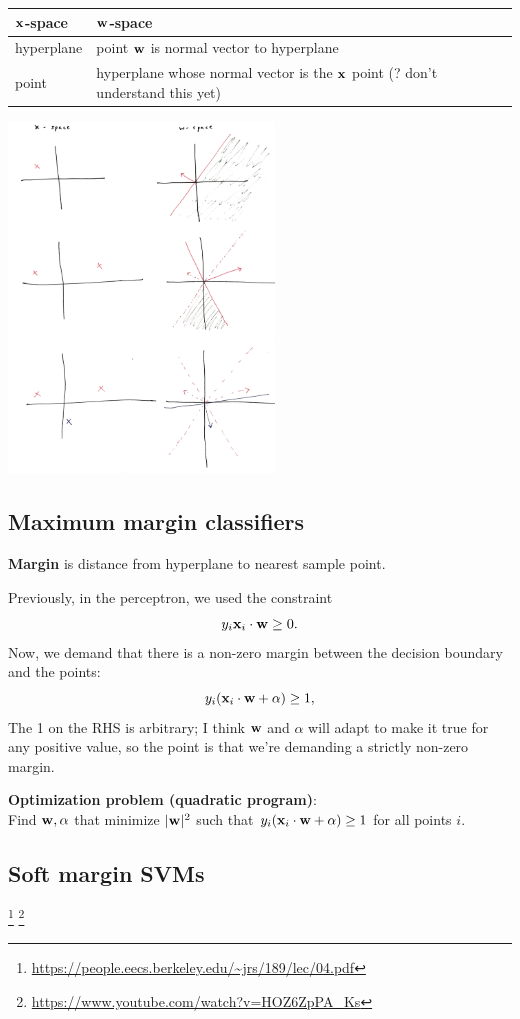 \begin{tabular}{l|l}
  $\mathbf x$-space    & $\mathbf w$-space \\
  \hline
  hyperplane & point $\mathbf w$ is normal vector to hyperplane \\
  point      & hyperplane whose normal vector is the $\mathbf x$ point (? don't understand this yet)
\end{tabular}

\includegraphics[width=200pt]{img/ml-perceptron-x-space-w-space.png}

\subsection{Maximum margin classifiers}
\textbf{Margin} is distance from hyperplane to nearest sample point.

Previously, in the perceptron, we used the constraint
$$y_i \mathbf x_i \cdot \mathbf w \geq 0.$$
Now, we demand that there is a non-zero margin between the decision boundary
and the points:
$$y_i (\mathbf x_i \cdot \mathbf w + \alpha) \geq 1,$$
The 1 on the RHS is arbitrary; I think $\mathbf w$ and $\alpha$ will adapt to make it
true for any positive value, so the point is that we're demanding a strictly
non-zero margin.
\\
\begin{mdframed}
  \textbf{Optimization problem (quadratic program)}:\\
    Find $\mathbf w, \alpha$ that minimize $|\mathbf w|^2$ such that
    $y_i(\mathbf x_i \cdot \mathbf w + \alpha) \geq 1$ for all points $i$.
\end{mdframed}

\subsection{Soft margin SVMs}
\footnote{\url{https://people.eecs.berkeley.edu/~jrs/189/lec/04.pdf}}
\footnote{ \url{https://www.youtube.com/watch?v=HOZ6ZpPA_Ks}}


